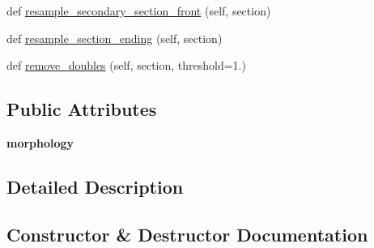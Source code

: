 \begin{DoxyCompactItemize}
\item 
def \hyperlink{classmeshy_1_1neuromorphovis_1_1morphologies_1_1morphology__analyzer_1_1MorphologyAnalyzer_a8d4567ff53e751a044ef274993b161a3}{resample\+\_\+secondary\+\_\+section\+\_\+front} (self, section)
\item 
def \hyperlink{classmeshy_1_1neuromorphovis_1_1morphologies_1_1morphology__analyzer_1_1MorphologyAnalyzer_a4ac32a41909b6acdfcd6e4c8e2163e45}{resample\+\_\+section\+\_\+ending} (self, section)
\item 
def \hyperlink{classmeshy_1_1neuromorphovis_1_1morphologies_1_1morphology__analyzer_1_1MorphologyAnalyzer_ad3ff19e6107b284d16ac384fc6bd1164}{remove\+\_\+doubles} (self, section, threshold=1.)
\end{DoxyCompactItemize}
\subsection*{Public Attributes}
\begin{DoxyCompactItemize}
\item 
{\bfseries morphology}\hypertarget{classmeshy_1_1neuromorphovis_1_1morphologies_1_1morphology__analyzer_1_1MorphologyAnalyzer_af1d11d2ee0563c5376203ccce4025958}{}\label{classmeshy_1_1neuromorphovis_1_1morphologies_1_1morphology__analyzer_1_1MorphologyAnalyzer_af1d11d2ee0563c5376203ccce4025958}

\end{DoxyCompactItemize}


\subsection{Detailed Description}


\subsection{Constructor \& Destructor Documentation}
